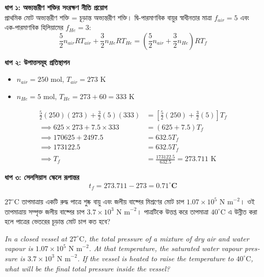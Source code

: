 \documentclass[12pt, a4paper]{article}
\begin{document}
\begin{tcolorbox}[solutionbox={সমাধান (Solution)}]
    \noindent
    \textbf{ধাপ ১: অভ্যন্তরীণ শক্তির সংরক্ষণ নীতি প্রয়োগ} \\
    প্রাথমিক মোট অভ্যন্তরীণ শক্তি = চূড়ান্ত অভ্যন্তরীণ শক্তি। দ্বি-পারমাণবিক বায়ুর স্বাধীনতার মাত্রা $f_{air} = 5$ এবং এক-পারমাণবিক হিলিয়ামের $f_{He} = 3$:
    \[ \frac{5}{2} n_{air} R T_{air} + \frac{3}{2} n_{He} R T_{He} = \left(\frac{5}{2} n_{air} + \frac{3}{2} n_{He}\right) R T_f \]
    
    \vspace{0.4em}
    \noindent\textbf{ধাপ ২: উপাত্তসমূহ প্রতিস্থাপন}
    \begin{itemize}[leftmargin=1.5em, itemsep=0.2em]
        \item $n_{air} = 250\text{ mol}$, $T_{air} = 273\text{ K}$
        \item $n_{He} = 5\text{ mol}$, $T_{He} = 273 + 60 = 333\text{ K}$
    \end{itemize}
    \begin{align*}
        \frac{5}{2} (250) (273) + \frac{3}{2} (5) (333) &= \left[\frac{5}{2} (250) + \frac{3}{2} (5)\right] T_f \\
        \implies 625 \times 273 + 7.5 \times 333 &= (625 + 7.5) T_f \\
        \implies 170625 + 2497.5 &= 632.5 T_f \\
        \implies 173122.5 &= 632.5 T_f \\
        \implies T_f &= \frac{173122.5}{632.5} = 273.711\text{ K}
    \end{align*}
    
    \vspace{0.4em}
    \noindent\textbf{ধাপ ৩: সেলসিয়াস স্কেলে রূপান্তর}
    \[ t_f = 273.711 - 273 = \mathbf{0.71^\circ\text{C}} \]
\end{tcolorbox}

\vspace{2em}

\begin{tcolorbox}[questionbox={প্রশ্ন (Question) 23}]
    \noindent
    $27^\circ\text{C}$ তাপমাত্রায় একটি রুদ্ধ পাত্রে শুষ্ক বায়ু এবং জলীয় বাষ্পের মিশ্রণের মোট চাপ $1.07 \times 10^5\text{ N m}^{-2}$। ওই তাপমাত্রায় সম্পৃক্ত জলীয় বাষ্পের চাপ $3.7 \times 10^3\text{ N m}^{-2}$। পাত্রটিকে উত্তপ্ত করে তাপমাত্রা $40^\circ\text{C}$ এ উন্নীত করা হলে পাত্রের ভেতরের চূড়ান্ত মোট চাপ কত হবে?
    
    \vspace{0.8em}
    \begin{english}
    \noindent\textit{\color{darkgray}
    In a closed vessel at $27^\circ\text{C}$, the total pressure of a mixture of dry air and water vapour is $1.07 \times 10^5\text{ N m}^{-2}$. At that temperature, the saturated water vapour pressure is $3.7 \times 10^3\text{ N m}^{-2}$. If the vessel is heated to raise the temperature to $40^\circ\text{C}$, what will be the final total pressure inside the vessel?
    }
    \end{english}
\end{tcolorbox}
\end{document}

